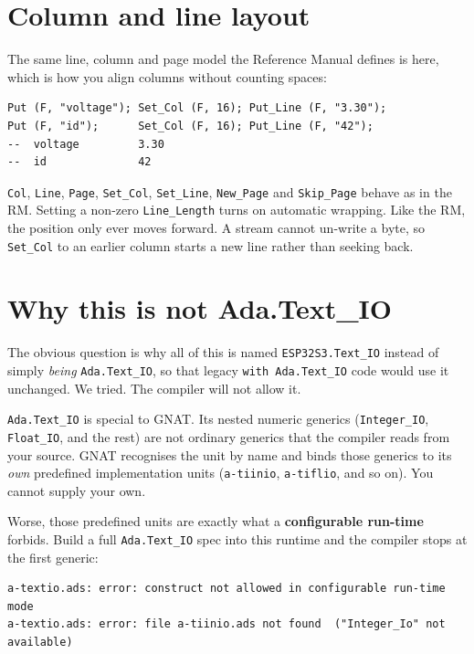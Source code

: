 \section{Column and line layout}

The same line, column and page model the Reference Manual defines is here, which
is how you align columns without counting spaces:

\begin{lstlisting}
Put (F, "voltage"); Set_Col (F, 16); Put_Line (F, "3.30");
Put (F, "id");      Set_Col (F, 16); Put_Line (F, "42");
--  voltage         3.30
--  id              42
\end{lstlisting}

\texttt{Col}, \texttt{Line}, \texttt{Page}, \texttt{Set\_Col}, \texttt{Set\_Line},
\texttt{New\_Page} and \texttt{Skip\_Page} behave as in the RM. Setting a non-zero
\texttt{Line\_Length} turns on automatic wrapping. Like the RM, the position only
ever moves forward. A stream cannot un-write a byte, so \texttt{Set\_Col} to an
earlier column starts a new line rather than seeking back.

\section{Why this is not Ada.Text\_IO}

The obvious question is why all of this is named \texttt{ESP32S3.Text\_IO} instead
of simply \emph{being} \texttt{Ada.Text\_IO}, so that legacy \texttt{with
Ada.Text\_IO} code would use it unchanged. We tried. The compiler will not allow
it.

\texttt{Ada.Text\_IO} is special to GNAT. Its nested numeric generics
(\texttt{Integer\_IO}, \texttt{Float\_IO}, and the rest) are not ordinary generics
that the compiler reads from your source. GNAT recognises the unit by name and
binds those generics to its \emph{own} predefined implementation units
(\texttt{a-tiinio}, \texttt{a-tiflio}, and so on). You cannot supply your own.

Worse, those predefined units are exactly what a \textbf{configurable run-time}
forbids. Build a full \texttt{Ada.Text\_IO} spec into this runtime and the compiler
stops at the first generic:

\begin{lstlisting}[style=sh]
a-textio.ads: error: construct not allowed in configurable run-time mode
a-textio.ads: error: file a-tiinio.ads not found  ("Integer_Io" not available)
\end{lstlisting}

